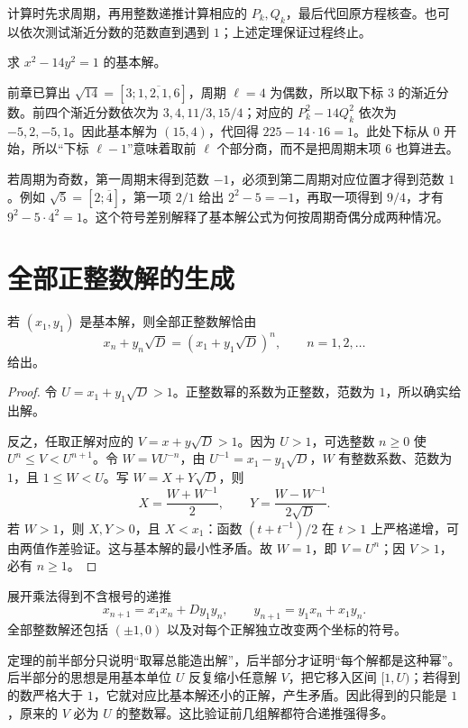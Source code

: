 \documentclass[UTF8,12pt,a4paper,fontset=fandol]{ctexbook}
\begin{document}
计算时先求周期，再用整数递推计算相应的 $P_k,Q_k$，最后代回原方程核查。也可以依次测试渐近分数的范数直到遇到 $1$；上述定理保证过程终止。

\begin{example}[从一个周期中读出基本解]
求 $x^2-14y^2=1$ 的基本解。
\end{example}
\begin{solve}
前章已算出 $\sqrt{14}=[3;\overline{1,2,1,6}]$，周期 $\ell=4$ 为偶数，所以取下标 $3$ 的渐近分数。前四个渐近分数依次为 $3,4,11/3,15/4$；对应的 $P_k^2-14Q_k^2$ 依次为 $-5,2,-5,1$。因此基本解为 $(15,4)$，代回得 $225-14\cdot16=1$。此处下标从 $0$ 开始，所以“下标 $\ell-1$”意味着取前 $\ell$ 个部分商，而不是把周期末项 $6$ 也算进去。
\end{solve}

若周期为奇数，第一周期末得到范数 $-1$，必须到第二周期对应位置才得到范数 $1$。例如 $\sqrt5=[2;\overline4]$，第一项 $2/1$ 给出 $2^2-5=-1$，再取一项得到 $9/4$，才有 $9^2-5\cdot4^2=1$。这个符号差别解释了基本解公式为何按周期奇偶分成两种情况。

\section{全部正整数解的生成}

\begin{theorem}
\label{thm:pell-all}
若 $(x_1,y_1)$ 是基本解，则全部正整数解恰由
\begin{equation}
 x_n+y_n\sqrt D=(x_1+y_1\sqrt D)^n,
 \qquad n=1,2,\ldots
 \label{eq:pell-all-solutions}
\end{equation}
给出。
\end{theorem}
\begin{proof}
令 $U=x_1+y_1\sqrt D>1$。正整数幂的系数为正整数，范数为 $1$，所以确实给出解。

反之，任取正解对应的 $V=x+y\sqrt D>1$。因为 $U>1$，可选整数 $n\ge0$ 使 $U^n\le V<U^{n+1}$。令 $W=VU^{-n}$，由 $U^{-1}=x_1-y_1\sqrt D$，$W$ 有整数系数、范数为 $1$，且 $1\le W<U$。写 $W=X+Y\sqrt D$，则
\[
 X=\frac{W+W^{-1}}2,\qquad
 Y=\frac{W-W^{-1}}{2\sqrt D}.
\]
若 $W>1$，则 $X,Y>0$，且 $X<x_1$：函数 $(t+t^{-1})/2$ 在 $t>1$ 上严格递增，可由两值作差验证。这与基本解的最小性矛盾。故 $W=1$，即 $V=U^n$；因 $V>1$，必有 $n\ge1$。
\end{proof}

展开乘法得到不含根号的递推
\[
 x_{n+1}=x_1x_n+Dy_1y_n,\qquad
 y_{n+1}=y_1x_n+x_1y_n.
\]
全部整数解还包括 $(\pm1,0)$ 以及对每个正解独立改变两个坐标的符号。

定理的前半部分只说明“取幂总能造出解”，后半部分才证明“每个解都是这种幂”。后半部分的思想是用基本单位 $U$ 反复缩小任意解 $V$，把它移入区间 $[1,U)$；若得到的数严格大于 $1$，它就对应比基本解还小的正解，产生矛盾。因此得到的只能是 $1$，原来的 $V$ 必为 $U$ 的整数幂。这比验证前几组解都符合递推强得多。
\end{document}

